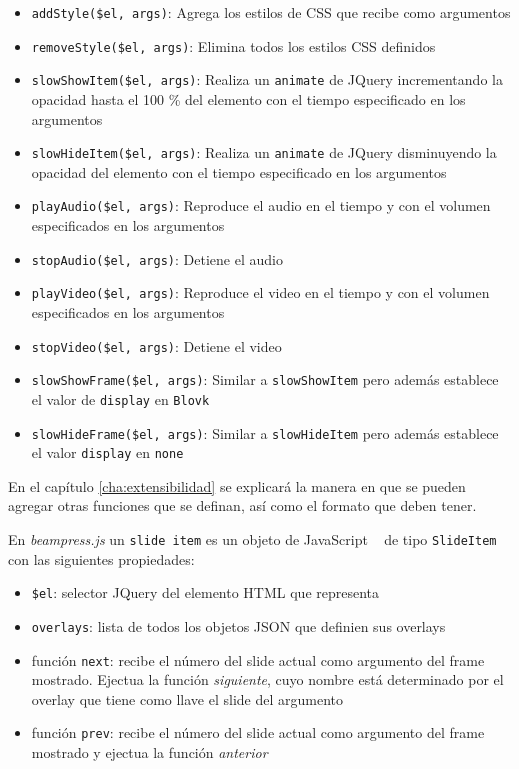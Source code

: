 			\begin{itemize}
				\item \texttt{addStyle(\$el, args)}: Agrega los estilos de CSS que recibe como argumentos
				\item \texttt{removeStyle(\$el, args)}: Elimina todos los estilos CSS definidos
				\item \texttt{slowShowItem(\$el, args)}: Realiza un \texttt{animate} de JQuery incrementando la opacidad hasta el 100 \% del elemento con el tiempo especificado en los argumentos
				\item \texttt{slowHideItem(\$el, args)}: Realiza un \texttt{animate} de JQuery disminuyendo la opacidad del elemento con el tiempo especificado en los argumentos
				\item \texttt{playAudio(\$el, args)}: Reproduce el audio en el tiempo y con el volumen especificados en los argumentos
				\item \texttt{stopAudio(\$el, args)}: Detiene el audio
				\item \texttt{playVideo(\$el, args)}: Reproduce el video en el tiempo y con el volumen especificados en los argumentos
				\item \texttt{stopVideo(\$el, args)}: Detiene el video
				\item \texttt{slowShowFrame(\$el, args)}: Similar a \texttt{slowShowItem} pero además establece el valor de \texttt{display} en \texttt{Blovk}
				\item \texttt{slowHideFrame(\$el, args)}: Similar a \texttt{slowHideItem} pero además establece el valor \texttt{display} en \texttt{none}				
			\end{itemize}
			En el capítulo \ref{cha:extensibilidad} se explicará la manera en que se pueden agregar otras funciones que se definan, así como el formato que deben tener.

			En \textit{beampress.js} un \texttt{slide item} es un objeto de JavaScript ~\cite{book:1047044} de tipo \texttt{SlideItem} con las siguientes propiedades:

			\begin{itemize}
			\label{it:slide_item}
			 	\item \texttt{\$el}: selector JQuery del elemento HTML que representa
			 	\item \texttt{overlays}: lista de todos los objetos JSON que definien sus overlays
			 	\item función \texttt{next}: recibe el número del slide actual como argumento del frame mostrado. Ejectua la función \textit{siguiente}, cuyo nombre está determinado por el overlay que tiene como llave el slide del argumento 
			 	\item función \texttt{prev}: recibe el número del slide actual como argumento del frame mostrado y ejectua la función \textit{anterior}			 	
			 \end{itemize} 
				

